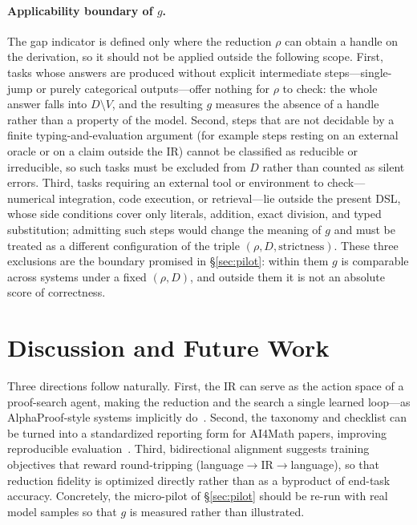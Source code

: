 \documentclass[11pt]{article}
\theoremstyle{definition}
\theoremstyle{plain}
\theoremstyle{remark}
\begin{document}
\paragraph{Applicability boundary of $g$.}
The gap indicator is defined only where the reduction $\rho$ can obtain a handle on the
derivation, so it should not be applied outside the following scope. First, tasks whose answers
are produced without explicit intermediate steps---single-jump or purely categorical
outputs---offer nothing for $\rho$ to check: the whole answer falls into $D \setminus V$, and
the resulting $g$ measures the absence of a handle rather than a property of the model.
Second, steps that are not decidable by a finite typing-and-evaluation argument (for example
steps resting on an external oracle or on a claim outside the IR) cannot be classified as
reducible or irreducible, so such tasks must be excluded from $D$ rather than counted as silent
errors. Third, tasks requiring an external tool or environment to check---numerical
integration, code execution, or retrieval---lie outside the present DSL, whose side conditions
cover only literals, addition, exact division, and typed substitution; admitting such steps
would change the meaning of $g$ and must be treated as a different configuration of the triple
$(\rho, D, \text{strictness})$. These three exclusions are the boundary promised in
\S\ref{sec:pilot}: within them $g$ is comparable across systems under a fixed $(\rho, D)$, and
outside them it is not an absolute score of correctness.

\section{Discussion and Future Work}\label{sec:discussion}
Three directions follow naturally. First, the IR can serve as the action space of a
proof-search agent, making the reduction and the search a single learned loop---as
AlphaProof-style systems implicitly do~\cite{hubert2025}. Second, the taxonomy and checklist
can be turned into a standardized reporting form for AI4Math papers, improving reproducible
evaluation~\cite{hendrycks2021,zheng2022}. Third, bidirectional alignment suggests training
objectives that reward round-tripping (language$\to$IR$\to$language), so that reduction
fidelity is optimized directly rather than as a byproduct of end-task accuracy. Concretely,
the micro-pilot of \S\ref{sec:pilot} should be re-run with real model samples so that $g$ is
measured rather than illustrated.
\end{document}
